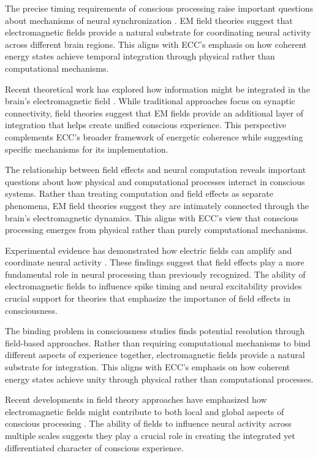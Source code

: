The precise timing requirements of conscious processing raise important questions about mechanisms of neural synchronization \cite{Radman2007}. EM field theories suggest that electromagnetic fields provide a natural substrate for coordinating neural activity across different brain regions. This aligns with ECC's emphasis on how coherent energy states achieve temporal integration through physical rather than computational mechanisms.

Recent theoretical work has explored how information might be integrated in the brain's electromagnetic field \cite{McFadden2020}. While traditional approaches focus on synaptic connectivity, field theories suggest that EM fields provide an additional layer of integration that helps create unified conscious experience. This perspective complements ECC's broader framework of energetic coherence while suggesting specific mechanisms for its implementation.

The relationship between field effects and neural computation \cite{Weiss2010} reveals important questions about how physical and computational processes interact in conscious systems. Rather than treating computation and field effects as separate phenomena, EM field theories suggest they are intimately connected through the brain's electromagnetic dynamics. This aligns with ECC's view that conscious processing emerges from physical rather than purely computational mechanisms.

Experimental evidence has demonstrated how electric fields can amplify and coordinate neural activity \cite{Radman2007}. These findings suggest that field effects play a more fundamental role in neural processing than previously recognized. The ability of electromagnetic fields to influence spike timing and neural excitability provides crucial support for theories that emphasize the importance of field effects in consciousness.

The binding problem in consciousness studies \cite{Singer2001} finds potential resolution through field-based approaches. Rather than requiring computational mechanisms to bind different aspects of experience together, electromagnetic fields provide a natural substrate for integration. This aligns with ECC's emphasis on how coherent energy states achieve unity through physical rather than computational processes.

Recent developments in field theory approaches have emphasized how electromagnetic fields might contribute to both local and global aspects of conscious processing \cite{John2001}. The ability of fields to influence neural activity across multiple scales suggests they play a crucial role in creating the integrated yet differentiated character of conscious experience.


